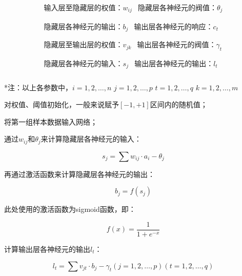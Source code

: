 \documentclass[UTF8]{ctexart}
\begin{document}
\begin{equation}
\begin{aligned}
\begin{matrix}
	\text{输入层至隐藏层的权值：}w_{ij}&		\text{隐藏层各神经元的阀值：}\theta _j\\
\end{matrix}
\\
\begin{matrix}
	\text{隐藏层各神经元的输出：}b_j&		\text{输出层各神经元的响应：}c_t\\
\end{matrix}
\\
\begin{matrix}
	\text{隐藏层至输出层的权值：}v_{jk}&		\text{输出层各神经元的阀值：}\gamma _t\\
\end{matrix}
\\
\begin{matrix}
	\text{隐藏层各神经元的输入：}s_j&		\text{输出层各神经元的输出：}l_t\\
\end{matrix}
\end{aligned}
\end{equation}\par
*注：以上各参数中，$i=1,2,…,n$ $j=1,2,…,p$ $t=1,2,…,q$  $k=1,2,…,m$\par
[1]对权值、阈值初始化，一般来说赋予$\left[ -1,+1 \right]$区间内的随机值； \par
[2]将第一组样本数据输入网络； \par
[3]通过$w_{ij}$和$\theta _j$来计算隐藏层各神经元的输入：\par
\begin{equation}
s_j=\sum{w_{ij}}\cdot a_i-\theta _j
\end{equation}\par
再通过激活函数来计算隐藏层各神经元的输出： \par
\begin{equation}
b_j=f\left( s_j \right) 
\end{equation}\par
此处使用的激活函数为sigmoid函数，即： \par
\begin{equation}
f\left( x \right) =\frac{1}{1+e^{-x}}
\end{equation}\par
[4]计算输出层各神经元的输出$l_t$： \par
\begin{equation}
	l_t=\sum{v_{jt}\cdot b_j-\gamma _t\left( j=1,2,…,p \right)}\left( t=1,2,…,q \right) 
\end{equation}\par
\end{document}
